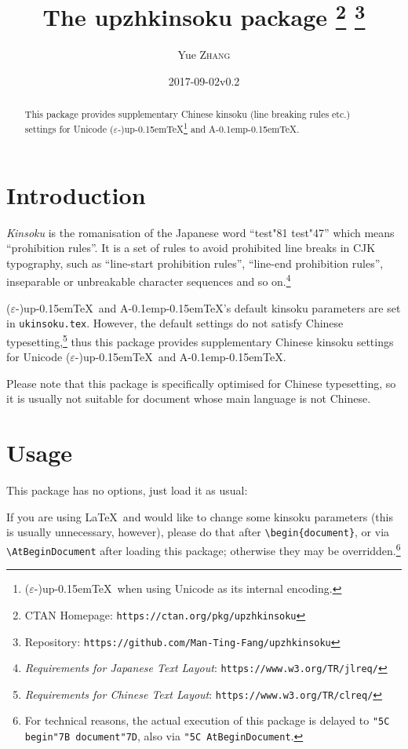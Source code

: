 \documentclass[a4paper]{article}
\newcommand\NormalSans{\normalfont\sffamily}
\newcommand\pkg[1]{{\protect\NormalSans#1}}
\newcommand\pTeX{p\kern-0.15em\TeX}
\newcommand\e{\ensuremath{\varepsilon}}
\newcommand\upTeX{u\pTeX}
\newcommand\ApTeX{A\kern-0.1em\pTeX}
\newcommand\kn{test}
\newcommand\sk{test}
\begin{document}
\title{The \pkg{upzhkinsoku} package%
  \thanks{CTAN Homepage: \texttt{https://ctan.org/pkg/upzhkinsoku}}
  \thanks{Repository: \texttt{https://github.com/Man-Ting-Fang/upzhkinsoku}}}
\author{Yue \textsc{Zhang}}
\date{2017-09-02\quad v0.2}

\maketitle

\begin{abstract}
This package provides supplementary Chinese kinsoku (line breaking rules etc.)
settings for Unicode (\e-)\upTeX\footnote{(\e-)\upTeX\ when using Unicode as its
internal encoding.} and \ApTeX.
\end{abstract}

\section{Introduction}

\textit{Kinsoku} is the romanisation of the Japanese word ``{\kn\char"81\relax
\sk\char"47}'' which means ``prohibition rules''. It is a set of rules to avoid
prohibited line breaks in CJK typography, such as ``line-start prohibition
rules'', ``line-end prohibition rules'', inseparable or unbreakable character
sequences and so on.\footnote{\textit{Requirements for Japanese Text Layout}:
\texttt{https://www.w3.org/TR/jlreq/}}

(\e-)\upTeX\ and \ApTeX's default kinsoku parameters are set in
\verb|ukinsoku.tex|. However, the default settings do not satisfy Chinese
typesetting,\footnote{\textit{Requirements for Chinese Text Layout}:
\texttt{https://www.w3.org/TR/clreq/}} thus this package provides supplementary
Chinese kinsoku settings for Unicode (\e-)\upTeX\ and \ApTeX.

Please note that this package is specifically optimised for Chinese typesetting,
so it is usually not suitable for document whose main language is not Chinese.

\section{Usage}

This package has no options, just load it as usual:
If you are using \LaTeX\ and would like to change some kinsoku parameters (this
is usually unnecessary, however), please do that after \verb|\begin{document}|,
or via \verb|\AtBeginDocument| after loading this package; otherwise they may be
overridden.\footnote{For technical reasons, the actual execution of this package
is delayed to \texttt{\char"5C begin\char"7B document\char"7D}, also via
\texttt{\char"5C AtBeginDocument}.}
\end{document}
